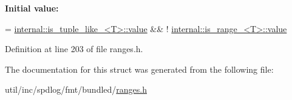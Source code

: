{\bfseries Initial value\+:}
\begin{DoxyCode}
=
    \hyperlink{classinternal_1_1is__tuple__like__}{internal::is\_tuple\_like\_<T>::value} && !
      \hyperlink{structinternal_1_1is__range__}{internal::is\_range\_<T>::value}
\end{DoxyCode}


Definition at line 203 of file ranges.\+h.



The documentation for this struct was generated from the following file\+:\begin{DoxyCompactItemize}
\item 
util/inc/spdlog/fmt/bundled/\hyperlink{ranges_8h}{ranges.\+h}\end{DoxyCompactItemize}
